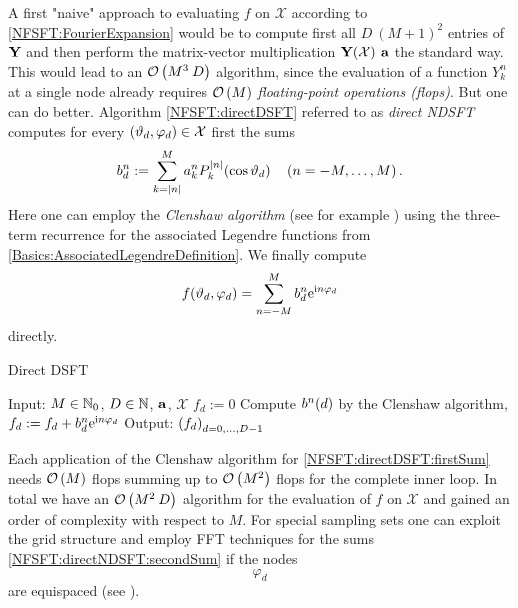 A first "naive" approach to evaluating $f$ on $\mathcal{X}$ according to \eqref{NFSFT:FourierExpansion} would be to compute first all $D\:(M+1)^2$
entries of $\mathbf{Y}$ and then perform the matrix-vector multiplication $\mathbf{Y}{\hspace{-0.4ex}}\left(\mathcal{X}\right) \: \mathbf{a}$ the standard way. This would lead to an $\mathcal{O}\left(M^3 \: D\right)$
algorithm, since the evaluation of a function $Y_{k}^n$ at a single node already requires $\mathcal{O}\left(M\right)$ \emph{floating-point operations (flops)}.
But one can do better. Algorithm \ref{NFSFT:directDSFT} referred to as \emph{direct NDSFT} computes 
for every $\left(\vartheta_{d},\varphi_{d}\right) \in \mathcal{X}$ first the sums 
\begin{equation}
  \label{NFSFT:directDSFT:firstSum}
  b^{n}_{d} := \sum_{k=\left\vert n\right\vert}^M a_{k}^n P_{k}^{\left\vert n\right\vert}{\hspace{-0.4ex}}\left(\cos\vartheta_{d}\right) \quad \left(n=-M,\ldots,M\right). 
\end{equation}
Here one can employ the \emph{Clenshaw algorithm} (see for example \cite{prtevefl}) using the three-term recurrence 
for the associated Legendre functions from \eqref{Basics:AssociatedLegendreDefinition}. We finally compute
\begin{equation}
  \label{NFSFT:directNDSFT:secondSum}
  f{\hspace{-0.4ex}}\left(\vartheta_{d},\varphi_{d}\right) = \sum_{n=-M}^M b^{n}_d \mbox{\rm{e}}^{\mbox{\scriptsize\rm{i}} n \varphi_{d}}
\end{equation}
directly.
\begin{algorithm}[b]
  \caption{Direct DSFT}
  \label{NFSFT:directDSFT}    
  \begin{algorithmic}
    \STATE  Input: $M \in \mathbb{N}_{0}$, $D \in \mathbb{N}$, $\mathbf{a}$, $\mathcal{X}$ %
    \STATE
      \STATE $f_{d} := 0$
        \STATE Compute $b^{n}{\hspace{-0.4ex}}\left(d\right)$ by the Clenshaw algorithm,
        \STATE $f_{d} := f_{d} + b^n_d \mbox{\rm{e}}^{\mbox{\scriptsize\rm{i}} n \varphi_{d}}$
      \ENDFOR
    \ENDFOR
    \STATE
    \STATE Output: $\left(f_{d}\right)_{d=0,\dots,D-1}$
\end{algorithmic}
\end{algorithm}
Each application of the Clenshaw algorithm for \eqref{NFSFT:directDSFT:firstSum} needs $\mathcal{O}\left(M\right)$ 
flops summing up to $\mathcal{O}\left(M^2\right)$ flops for the complete inner loop. In 
total we have an $\mathcal{O}\left(M^2\:D\right)$ algorithm for the evaluation of $f$ on $\mathcal{X}$ and gained an order of complexity with respect to $M$. 
For special sampling sets one can exploit the grid 
structure and employ FFT techniques for the sums \eqref{NFSFT:directNDSFT:secondSum} if the nodes $$\varphi_{d}$$  are equispaced 
(see  \cite{postta97} \cite{kupo02}). 


